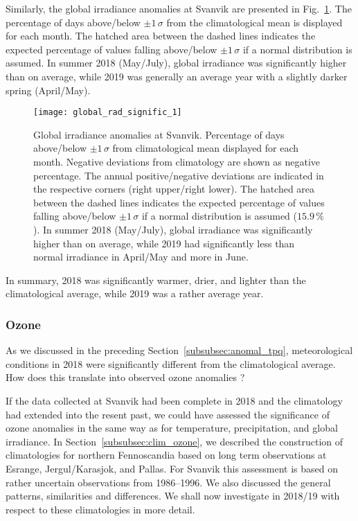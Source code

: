 \documentclass[bg, manuscript]{copernicus}
\begin{document}
Similarly, the global irradiance anomalies at Svanvik are presented in Fig.~\ref{fig:global_rad_signific}. The percentage of days above/below $\pm 1\,\sigma$ from the climatological mean is displayed for each month. The hatched area between the dashed lines indicates the expected percentage of values falling above/below $\pm 1\,\sigma$ if a normal distribution is assumed. In summer 2018 (May/July), global irradiance was significantly higher than on average, while 2019 was generally an average year with a slightly darker spring (April/May).

\begin{figure}[t]
  \texttt{[image: global\_rad\_signific\_1]}
  \caption{Global irradiance anomalies at Svanvik. Percentage of days above/below $\pm 1\,\sigma$ from climatological mean displayed for each month. Negative deviations from climatology are shown as negative percentage. The annual positive/negative deviations are indicated in the respective corners (right upper/right lower). The hatched area between the dashed lines indicates the expected percentage of values falling above/below $\pm 1\,\sigma$ if a normal distribution is assumed ($15.9\,\unit{\%}$). In summer 2018 (May/July), global irradiance was significantly higher than on average, while 2019 had significantly less than normal irradiance in April/May and more in June.}
  \label{fig:global_rad_signific}
\end{figure}

In summary, 2018 was significantly warmer, drier, and lighter than the climatological average, while 2019 was a rather average year.

\subsubsection{Ozone}
\label{subsubsec:anomal_ozone}
As we discussed in the preceding Section~\ref{subsubsec:anomal_tpq}, meteorological conditions in 2018 were significantly different from the climatological average. How does this translate into observed ozone anomalies \chem{\Delta[O_3]}?

If the data collected at Svanvik had been complete in 2018 and the climatology had extended into the resent past, we could have assessed the significance of ozone anomalies in the same way as for temperature, precipitation, and global irradiance. In Section~\ref{subsubsec:clim_ozone}, we described the construction of climatologies for northern Fennoscandia based on long term observations at Esrange, Jergul/Karasjok, and Pallas. For Svanvik this assessment is based on rather uncertain observations from 1986--1996. We also discussed the general patterns, similarities and differences. We shall now investigate \chem{\Delta[O_3]} in 2018/19 with respect to these climatologies in more detail.
\end{document}
